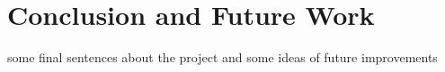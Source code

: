 
\chapter{Conclusion and Future Work}

some final sentences about the project and some ideas of future improvements